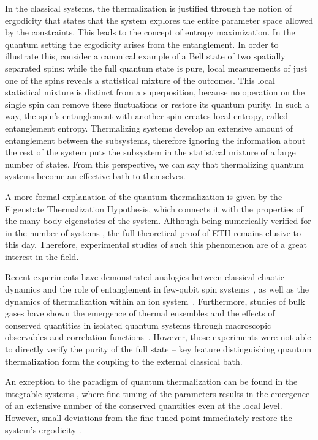 In the classical systems, the thermalization is justified through the notion of ergodicity that states that the system explores the entire parameter space allowed by the constraints. This leads to the concept of entropy maximization. In the quantum setting the ergodicity arises from the entanglement. In order to illustrate this, consider a canonical example of a Bell state of two spatially separated spins: while the full quantum state is pure, local measurements of just one of the spins reveals a statistical mixture of the outcomes. This local statistical mixture is distinct from a superposition, because no operation on the single spin can remove these fluctuations or restore its quantum purity. In such a way, the spin's entanglement with another spin creates local entropy, called entanglement entropy. Thermalizing systems develop an extensive amount of entanglement between the subsystems, therefore ignoring the information about the rest of the system puts the subsystem in the statistical mixture of a large number of states. From this perspective, we can say that thermalizing quantum systems become an effective bath to themselves.

A more formal explanation of the quantum thermalization is given by the Eigenstate Thermalization Hypothesis, which connects it with the properties of the many-body eigenstates of the system. Although being numerically verified for in the number of systems \cite{ Olshanii2008, Phys. Rev. E 86, 010102(R), DAlessio2015, Phys. Rev. B 91, 155123}, the full theoretical proof of ETH remains elusive to this day. Therefore, experimental studies of such this phenomenon are of a great interest in the field.

Recent experiments have demonstrated analogies between classical chaotic dynamics and the role of entanglement in few-qubit spin systems~\cite{Martinis2016}, as well as the dynamics of thermalization within an ion system~\cite{Schaetz2015}. Furthermore, studies of bulk gases have shown the emergence of thermal ensembles and the effects of conserved quantities in isolated quantum systems through macroscopic observables and correlation functions~\cite{Trotzky2012,Langen2013,Geiger2014,Langen2015}. However, those experiments were not able to directly verify the purity of the full state -- key feature distinguishing quantum thermalization form the coupling to the external classical bath.

An exception to the paradigm of quantum thermalization can be found in the integrable systems \cite{ Phys. Rev. Lett. 100, 210403 (2008)}, where fine-tuning of the parameters results in the emergence of an extensive number of the conserved quantities even at the local level. However, small deviations from the fine-tuned point immediately restore the system’s ergodicity \cite{ Phys. Rev. X 8, 021030}.

